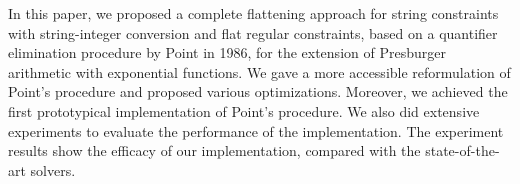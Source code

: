 
In this paper, we proposed a complete flattening approach for string constraints with string-integer conversion and flat regular constraints, based on a quantifier elimination procedure by Point in 1986, for the extension of Presburger arithmetic with exponential functions. We gave a more accessible reformulation of Point's procedure and proposed various optimizations. Moreover, we achieved the first prototypical implementation of Point's procedure. We also did extensive experiments to evaluate the performance of the implementation. The experiment results show the efficacy of our implementation, compared with the state-of-the-art solvers. 
